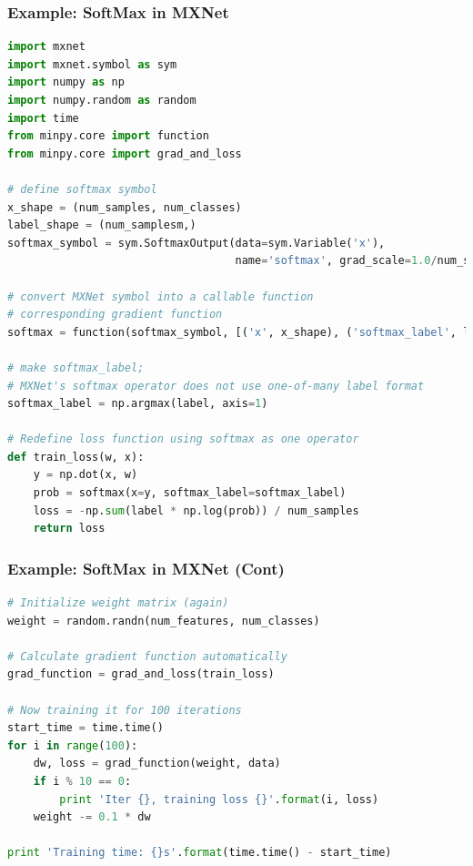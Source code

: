 \begin{frame}[fragile]
  \MyLogo
  \frametitle{Example: SoftMax in MXNet}  

\begin{lstlisting}[language=python]
import mxnet
import mxnet.symbol as sym
import numpy as np
import numpy.random as random
import time
from minpy.core import function
from minpy.core import grad_and_loss

# define softmax symbol
x_shape = (num_samples, num_classes)
label_shape = (num_samplesm,)
softmax_symbol = sym.SoftmaxOutput(data=sym.Variable('x'), 
                                   name='softmax', grad_scale=1.0/num_samples)

# convert MXNet symbol into a callable function 
# corresponding gradient function
softmax = function(softmax_symbol, [('x', x_shape), ('softmax_label', label_shape)])

# make softmax_label; 
# MXNet's softmax operator does not use one-of-many label format
softmax_label = np.argmax(label, axis=1)

# Redefine loss function using softmax as one operator
def train_loss(w, x):
    y = np.dot(x, w)
    prob = softmax(x=y, softmax_label=softmax_label)
    loss = -np.sum(label * np.log(prob)) / num_samples
    return loss
\end{lstlisting}

\end{frame}

\begin{frame}[fragile]
  \MyLogo
  \frametitle{Example: SoftMax in MXNet (Cont)}  

\ContinueLineNumber
\scriptsize{
\begin{lstlisting}[language=python]
# Initialize weight matrix (again)
weight = random.randn(num_features, num_classes)

# Calculate gradient function automatically
grad_function = grad_and_loss(train_loss)

# Now training it for 100 iterations
start_time = time.time()
for i in range(100):
    dw, loss = grad_function(weight, data)
    if i % 10 == 0:
        print 'Iter {}, training loss {}'.format(i, loss)
    weight -= 0.1 * dw
    
print 'Training time: {}s'.format(time.time() - start_time)
\end{lstlisting}
}

\vskip 100pt

\end{frame}
